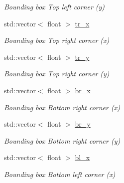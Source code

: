 \begin{DoxyCompactItemize}
\begin{DoxyCompactList}\small\item\em Bounding box Top left corner (y) \end{DoxyCompactList}\item 
\mbox{\label{classMsg_af35bb671f11882d692ce5e7dc3a2450d}} 
std\+::vector$<$ float $>$ \hyperlink{classMsg_af35bb671f11882d692ce5e7dc3a2450d}{tr\+\_\+x}
\begin{DoxyCompactList}\small\item\em Bounding box Top right corner (x) \end{DoxyCompactList}\item 
\mbox{\label{classMsg_a01a12ff662d24f39f4fd627296856953}} 
std\+::vector$<$ float $>$ \hyperlink{classMsg_a01a12ff662d24f39f4fd627296856953}{tr\+\_\+y}
\begin{DoxyCompactList}\small\item\em Bounding box Top right corner (y) \end{DoxyCompactList}\item 
\mbox{\label{classMsg_a4192f2fd97c9e2cb240f94ea5039f932}} 
std\+::vector$<$ float $>$ \hyperlink{classMsg_a4192f2fd97c9e2cb240f94ea5039f932}{br\+\_\+x}
\begin{DoxyCompactList}\small\item\em Bounding box Bottom right corner (x) \end{DoxyCompactList}\item 
\mbox{\label{classMsg_a847a86aeb855919ab8cb93e3181ae89a}} 
std\+::vector$<$ float $>$ \hyperlink{classMsg_a847a86aeb855919ab8cb93e3181ae89a}{br\+\_\+y}
\begin{DoxyCompactList}\small\item\em Bounding box Bottom right corner (y) \end{DoxyCompactList}\item 
\mbox{\label{classMsg_a07cba099f9b2d25453153874e2798d77}} 
std\+::vector$<$ float $>$ \hyperlink{classMsg_a07cba099f9b2d25453153874e2798d77}{bl\+\_\+x}
\begin{DoxyCompactList}\small\item\em Bounding box Bottom left corner (x) \end{DoxyCompactList}\item 

\end{DoxyCompactItemize}
